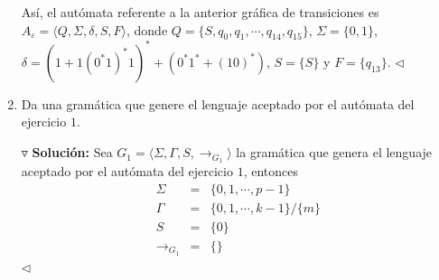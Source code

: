 \documentclass{article}
\begin{document}
\begin{enumerate}
\begin{center}
  \end{center}
  Así, el autómata referente a la anterior gráfica de transiciones es
  $A_{\varepsilon} = \langle Q, \Sigma, \delta, S, F\rangle$, donde
  $Q = \{S, q_0, q_1, \dotsm, q_{14}, q_{15}\}$, $\Sigma = \{0, 1\}$,
  $\delta =   (1 + 1(0^{*}1)^{*}1)^{*} + (0^{*}1^{*} + (10)^{*})$,
  $S = \{S\}$ y $F = \{q_{13}\}$.
  \hfill $\lhd$

\item Da una gramática que genere el lenguaje aceptado por el autómata del ejercicio $1$.
  
  $\triangledown$ \textbf{Solución:}
  Sea $G_{1} = \langle \Sigma, \Gamma, S, \rightarrow_{G_1}\rangle$ la gramática que genera
  el lenguaje aceptado por el autómata del ejercicio $1$, entonces
  \begin{eqnarray*}
    \Sigma &=& \{0,1, \dotsm, p-1\}\\
    \Gamma &=& \{0, 1, \dotsm, k - 1\}/\{m\}\\
    S      &=& \{0\}\\
    \rightarrow_{G_{1}} &=& \{\}
  \end{eqnarray*}
  \hfill $\lhd$
\end{enumerate}
\end{document}
